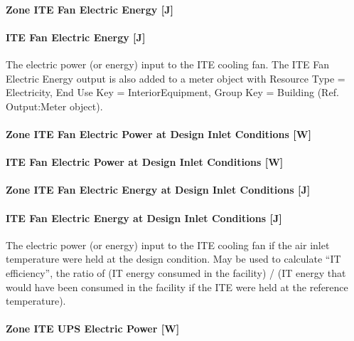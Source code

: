 \paragraph{Zone ITE Fan Electric Energy {[}J{]}}\label{zone-ite-fan-electric-energy-j}

\paragraph{ITE Fan Electric Energy {[}J{]}}\label{ite-fan-electric-energy-j}

The electric power (or energy) input to the ITE cooling fan. The ITE Fan Electric Energy output is also added to a meter object with Resource Type = Electricity, End Use Key = InteriorEquipment, Group Key = Building (Ref. Output:Meter object).

\paragraph{Zone ITE Fan Electric Power at Design Inlet Conditions {[}W{]}}\label{zone-ite-fan-electric-power-at-design-inlet-conditions-w}

\paragraph{ITE Fan Electric Power at Design Inlet Conditions {[}W{]}}\label{ite-fan-electric-power-at-design-inlet-conditions-w}

\paragraph{Zone ITE Fan Electric Energy at Design Inlet Conditions {[}J{]}}\label{zone-ite-fan-electric-energy-at-design-inlet-conditions-j}

\paragraph{ITE Fan Electric Energy at Design Inlet Conditions {[}J{]}}\label{ite-fan-electric-energy-at-design-inlet-conditions-j}

The electric power (or energy) input to the ITE cooling fan if the air inlet temperature were held at the design condition. May be used to calculate ``IT efficiency'', the ratio of (IT energy consumed in the facility) / (IT energy that would have been consumed in the facility if the ITE were held at the reference temperature).

\paragraph{Zone ITE UPS Electric Power {[}W{]}}\label{zone-ite-ups-electric-power-w}

